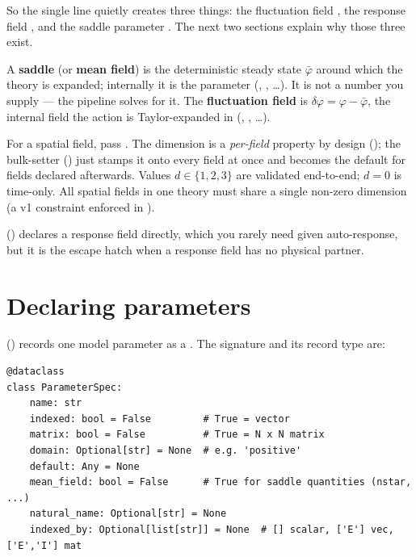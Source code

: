 So the single line  quietly creates three things: the
fluctuation field , the response field , and the saddle
parameter . The next two sections explain why those three exist.

\begin{defn}
A \textbf{saddle} (or \textbf{mean field}) is the deterministic steady state
$\bar\varphi$ around which the theory is expanded; internally it is the
 parameter (, , \ldots). It is not a number
you supply --- the pipeline solves for it. The \textbf{fluctuation field} is
$\delta\varphi = \varphi - \bar\varphi$, the internal field the action is
Taylor-expanded in (, , \ldots).
\end{defn}

For a spatial field, pass . The dimension is a
\emph{per-field} property by design (); the
bulk-setter  () just stamps it
onto every field at once and becomes the default for fields declared afterwards.
Values $d \in \{1,2,3\}$ are validated end-to-end; $d=0$ is time-only. All spatial
fields in one theory must share a single non-zero dimension (a v1 constraint
enforced in ).

 () declares a response field
directly, which you rarely need given auto-response, but it is the escape hatch
when a response field has no physical partner.

\section{Declaring parameters}

 () records one model parameter as a
. The signature and its record type are:

\begin{lstlisting}
@dataclass
class ParameterSpec:
    name: str
    indexed: bool = False         # True = vector
    matrix: bool = False          # True = N x N matrix
    domain: Optional[str] = None  # e.g. 'positive'
    default: Any = None
    mean_field: bool = False      # True for saddle quantities (nstar, ...)
    natural_name: Optional[str] = None
    indexed_by: Optional[list[str]] = None  # [] scalar, ['E'] vec, ['E','I'] mat
\end{lstlisting}

